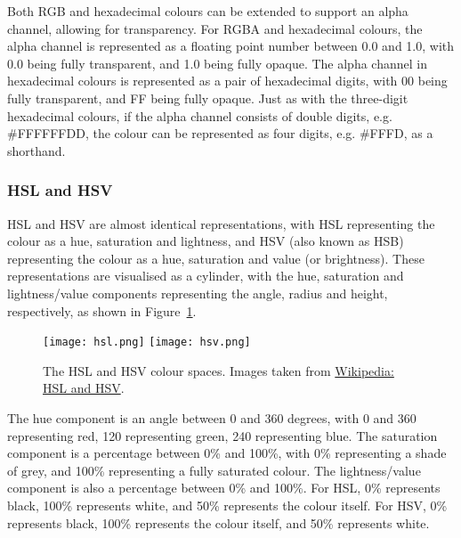 \documentclass[../main.tex]{subfiles}
\begin{document}
                Both RGB and hexadecimal colours can be extended to support an alpha channel,
                    allowing for transparency.
                For RGBA and hexadecimal colours, the alpha channel is represented as a
                    floating point number between 0.0 and 1.0, with 0.0 being fully transparent,
                    and 1.0 being fully opaque.
                The alpha channel in hexadecimal colours is represented as a pair of
                    hexadecimal digits, with 00 being fully transparent, and FF being fully opaque.
                Just as with the three-digit hexadecimal colours, if the alpha channel consists
                    of double digits, e.g. \#FFFFFFDD, the colour can be represented as four
                    digits, e.g. \#FFFD, as a shorthand.

            \subsubsection{HSL and HSV}
                HSL and HSV are almost identical representations, with HSL representing the
                    colour as a hue, saturation and lightness, and HSV (also known as HSB)
                    representing the colour as a hue, saturation and value (or brightness).
                These representations are visualised as a cylinder, with the hue, saturation
                    and lightness/value components representing the angle, radius and height,
                    respectively, as shown in Figure~\ref{fig:hsl}.

                \begin{figure}[H]
                    \centering
                    \texttt{[image: hsl.png]}
                    \texttt{[image: hsv.png]}
                        \caption{The HSL and HSV colour spaces.
                            Images taken from \href{https://en.wikipedia.org/wiki/HSL_and_HSV}{Wikipedia:
                                    HSL and HSV}.
                        }
                        \label{fig:hsl}
                \end{figure}

                The hue component is an angle between 0 and 360 degrees, with 0 and 360
                    representing red, 120 representing green, 240 representing blue.
                The saturation component is a percentage between 0\% and 100\%, with 0\%
                    representing a shade of grey, and 100\% representing a fully saturated colour.
                The lightness/value component is also a percentage between 0\% and 100\%.
                For HSL, 0\% represents black, 100\% represents white, and 50\% represents the
                    colour itself.
                For HSV, 0\% represents black, 100\% represents the colour itself, and 50\%
                    represents white.
\end{document}
